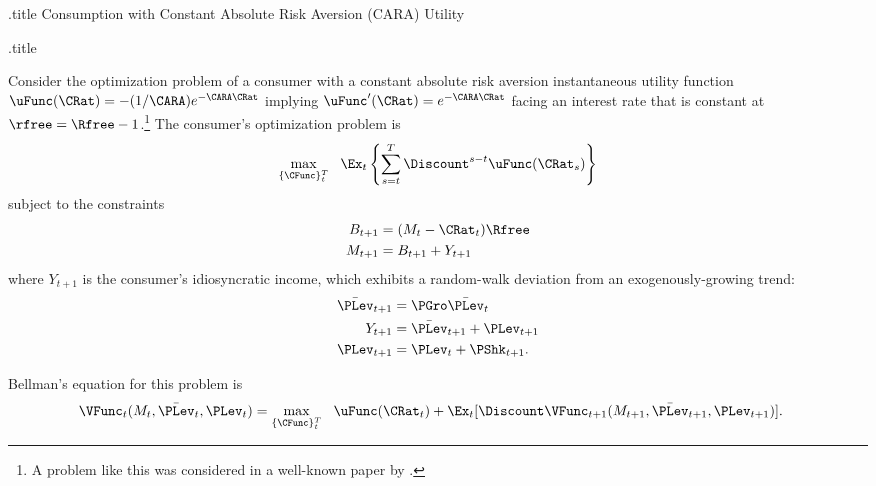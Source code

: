 \documentclass{handout}
\begin{document}
\begin{verbatimwrite}{\jobname.title}
Consumption with Constant Absolute Risk Aversion (CARA) Utility
\end{verbatimwrite}

\handoutHeader

\centerline{\Large  \jobname.title}\vspace{.15in}

Consider the optimization problem of a consumer with a constant
absolute risk aversion instantaneous utility function $\uFunc(\CRat)=
-(1/\CARA) e^{-\CARA \CRat}$ implying $\uFunc^{\prime}(\CRat) =
e^{-\CARA \CRat}$ facing an interest rate that is constant at
$\rfree=\Rfree-1$.\footnote{A problem like this was considered in a well-known paper by \cite{caballero:jme}.}  The consumer's optimization problem is
\begin{equation}
\max_{\{\CFunc\}_{t}^{T}}~~ \Ex_{t}\left\{\sum_{s=t}^{T} \Discount^{s-t} \uFunc(\CRat_{s})\right\}            \label{eq:maxprob}
\end{equation}
subject to the constraints 
\begin{equation}\begin{gathered}\begin{aligned}
    B_{t+1} & =  ({M}_{t}-\CRat_{t})\Rfree
\\      {M}_{t+1} & =  B_{t+1}+Y_{t+1}
\end{aligned}\end{gathered}\end{equation}
where $Y_{t+1}$ is the consumer's idiosyncratic income, which exhibits a
random-walk deviation from an exogenously-growing trend:
\begin{equation*}\begin{gathered}\begin{aligned}
        \bar{\PLev}_{t+1} & =  \PGro \bar{\PLev}_{t}  \\
        Y_{t+1} & =  \bar{\PLev}_{t+1}+\PLev_{t+1}
\\      \PLev_{t+1} & =  \PLev_{t}+\PShk_{t+1}.
\end{aligned}\end{gathered}\end{equation*}

\noindent Bellman's equation for this problem is 
\begin{equation}\begin{gathered}\begin{aligned}
        \VFunc_{t}({M}_{t},\bar{\PLev}_{t},\PLev_{t}) & =  \max_{\{\CFunc\}_{t}^{T}} ~~ \uFunc(\CRat_{t}) + \Ex_{t}[\Discount \VFunc_{t+1}({M}_{t+1},\bar{\PLev}_{t+1},{\PLev}_{t+1})]    \label{eq:vmax}.
\end{aligned}\end{gathered}\end{equation}
\end{document}
